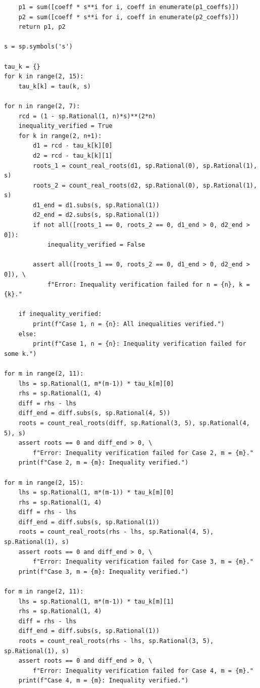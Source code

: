 \documentclass{article}
\theoremstyle{plain}
\theoremstyle{definition}
\theoremstyle{remark}
\begin{document}
\begin{verbatim}
    p1 = sum([coeff * s**i for i, coeff in enumerate(p1_coeffs)])
    p2 = sum([coeff * s**i for i, coeff in enumerate(p2_coeffs)])
    return p1, p2

s = sp.symbols('s')

tau_k = {}
for k in range(2, 15):
    tau_k[k] = tau(k, s)

for n in range(2, 7):
    rcd = (1 - sp.Rational(1, n)*s)**(2*n)
    inequality_verified = True
    for k in range(2, n+1):
        d1 = rcd - tau_k[k][0]
        d2 = rcd - tau_k[k][1]
        roots_1 = count_real_roots(d1, sp.Rational(0), sp.Rational(1), s)
        roots_2 = count_real_roots(d2, sp.Rational(0), sp.Rational(1), s)
        d1_end = d1.subs(s, sp.Rational(1))
        d2_end = d2.subs(s, sp.Rational(1))
        if not all([roots_1 == 0, roots_2 == 0, d1_end > 0, d2_end > 0]):
            inequality_verified = False

        assert all([roots_1 == 0, roots_2 == 0, d1_end > 0, d2_end > 0]), \
            f"Error: Inequality verification failed for n = {n}, k = {k}."

    if inequality_verified:
        print(f"Case 1, n = {n}: All inequalities verified.")
    else:
        print(f"Case 1, n = {n}: Inequality verification failed for some k.")

for m in range(2, 11):
    lhs = sp.Rational(1, m*(m-1)) * tau_k[m][0]
    rhs = sp.Rational(1, 4)
    diff = rhs - lhs
    diff_end = diff.subs(s, sp.Rational(4, 5))
    roots = count_real_roots(diff, sp.Rational(3, 5), sp.Rational(4, 5), s)
    assert roots == 0 and diff_end > 0, \
        f"Error: Inequality verification failed for Case 2, m = {m}."
    print(f"Case 2, m = {m}: Inequality verified.")

for m in range(2, 15):
    lhs = sp.Rational(1, m*(m-1)) * tau_k[m][0]
    rhs = sp.Rational(1, 4)
    diff = rhs - lhs
    diff_end = diff.subs(s, sp.Rational(1))
    roots = count_real_roots(rhs - lhs, sp.Rational(4, 5), sp.Rational(1), s)
    assert roots == 0 and diff_end > 0, \
        f"Error: Inequality verification failed for Case 3, m = {m}."
    print(f"Case 3, m = {m}: Inequality verified.")

for m in range(2, 11):
    lhs = sp.Rational(1, m*(m-1)) * tau_k[m][1]
    rhs = sp.Rational(1, 4)
    diff = rhs - lhs
    diff_end = diff.subs(s, sp.Rational(1))
    roots = count_real_roots(rhs - lhs, sp.Rational(3, 5), sp.Rational(1), s)
    assert roots == 0 and diff_end > 0, \
        f"Error: Inequality verification failed for Case 4, m = {m}."
    print(f"Case 4, m = {m}: Inequality verified.")

\end{verbatim}
\end{document}

